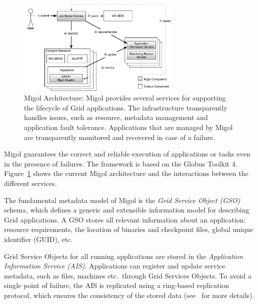 \documentclass[times, 10pt,twocolumn]{article}
\begin{document}
\begin{figure}[t]
            \centering
                \includegraphics[width=0.7\textwidth]{migol_architecture}
            \caption{Migol Architecture: Migol provides several services for supporting the lifecycle of Grid applications. The infrastructure transparently handles issues, such as resource, metadata management and application fault tolerance.  Applications that are managed by Migol are transparently monitored and recovered in case of a failure.}
            \label{fig:migol_architecture} 
\end{figure}           


Migol guarantees the correct and reliable exe\-cution of applications or tasks even in
the presence of  failures. The framework is based on the Globus Toolkit 4. 
Figure~\ref{fig:migol_architecture} shows the current Migol architecture and 
the interactions between the different services.

The fundamental metadata model of Migol is the \emph{Grid Service Object (GSO)} schema,
which defines a generic and extensible information model for
describing Grid applications.  
A GSO stores all relevant information about an application: resource requirements,
the location of binaries and checkpoint files, global unique identifier (GUID),
etc.

Grid Service Objects for all running applications are stored in 
the {\em Application Information Service (AIS)}. 
Applications can register and update service metadata, 
such as files, machines etc.\ through Grid Services Objects. 
To avoid a single point of failure, the AIS is replicated using a ring-based
replication protocol, which ensures  the consistency of the stored data
(see~\cite{Luckow:2008ys} for more details).
\end{document}
